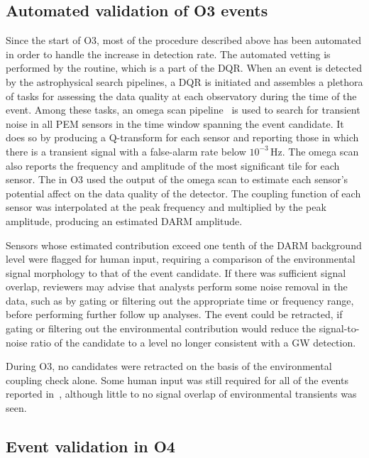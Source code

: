 \subsection{Automated validation of O3 events}

Since the start of \ac{O3}, most of the procedure described above has been automated in order to handle the increase in detection rate.
The automated vetting is performed by the  routine, which is a part of the \ac{DQR}.
When an event is detected by the astrophysical search pipelines, a \ac{DQR} is initiated and assembles a plethora of tasks for assessing the data quality at each observatory during the time of the event.
Among these tasks, an omega scan pipeline~\citep{Davis_2021, Chatterji_2004} is used to search for transient noise in all \ac{PEM} sensors in the time window spanning the event candidate.
It does so by producing a Q-transform for each sensor and reporting those in which there is a transient signal with a false-alarm rate below $10^{-3}$\,Hz.
The omega scan also reports the frequency and amplitude of the most significant tile for each sensor.
The  in \ac{O3} used the output of the omega scan to estimate each sensor's potential affect on the data quality of the detector.
The coupling function of each sensor was interpolated at the peak frequency and multiplied by the peak amplitude, producing an estimated \ac{DARM} amplitude.

Sensors whose estimated contribution exceed one tenth of the \ac{DARM} background level were flagged for human input, requiring a comparison of the environmental signal morphology to that of the event candidate.
If there was sufficient signal overlap, reviewers may advise that analysts perform some noise removal in the data, such as by gating or filtering out the appropriate time or frequency range, before performing further follow up analyses.
The event could be retracted, if gating or filtering out the environmental contribution would reduce the signal-to-noise ratio of the candidate to a level no longer consistent with a GW detection.

During \ac{O3}, no candidates were retracted on the basis of the environmental coupling check alone.
Some human input was still required for all of the \XX events reported in~\citep{gwtc2}, although little to no signal overlap of environmental transients was seen.


\subsection{Event validation in O4}

